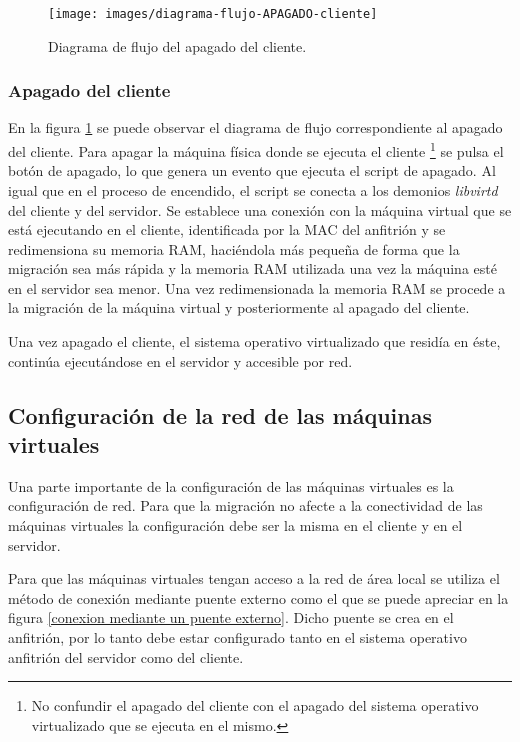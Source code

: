 \documentclass[spanisheDIVcalc,twoside,parskip-,pointlessnumbers,final]{scrbook}
\begin{document}
\begin{figure}[htpb]
\begin{centering}
\texttt{[image: images/diagrama-flujo-APAGADO-cliente]}
\par\end{centering}

\caption{Diagrama de flujo del apagado del cliente.}
\label{diagrama-flujo-apagado-cliente}

\end{figure}



\subsubsection{Apagado del cliente}

En la figura \ref{diagrama-flujo-apagado-cliente} se puede observar
el diagrama de flujo correspondiente al apagado del cliente. Para
apagar la máquina física donde se ejecuta el cliente%
\footnote{No confundir el apagado del cliente con el apagado del sistema operativo
virtualizado que se ejecuta en el mismo.%
} se pulsa el botón de apagado, lo que genera un evento que ejecuta
el script de apagado. Al igual que en el proceso de encendido, el
script se conecta a los demonios \emph{libvirtd }del cliente y del
servidor. Se establece una conexión con la máquina virtual que se
está ejecutando en el cliente, identificada por la MAC del anfitrión
y se redimensiona su memoria RAM, haciéndola más pequeña de forma
que la migración sea más rápida y la memoria RAM utilizada una vez
la máquina esté en el servidor sea menor. Una vez redimensionada la
memoria RAM se procede a la migración de la máquina virtual y posteriormente
al apagado del cliente.

Una vez apagado el cliente, el sistema operativo virtualizado que
residía en éste, continúa ejecutándose en el servidor y accesible
por red.


\subsection{Configuración de la red de las máquinas virtuales}

Una parte importante de la configuración de las máquinas virtuales
es la configuración de red. Para que la migración no afecte a la conectividad
de las máquinas virtuales la configuración debe ser la misma en el
cliente y en el servidor.

Para que las máquinas virtuales tengan acceso a la red de área local
se utiliza el método de conexión mediante puente externo como el que
se puede apreciar en la figura \ref{conexion mediante un puente externo}.
Dicho puente se crea en el anfitrión, por lo tanto debe estar configurado
tanto en el sistema operativo anfitrión del servidor como del cliente. 
\end{document}
